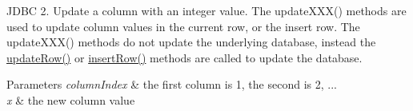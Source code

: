 J\+D\+BC 2. Update a column with an integer value. The update\+X\+X\+X() methods are used to update column values in the current row, or the insert row. The update\+X\+X\+X() methods do not update the underlying database, instead the \mbox{\hyperlink{classcom_1_1mysql_1_1jdbc_1_1_updatable_result_set_a919969ba4b3c7cbc7b18605e9f31a746}{update\+Row()}} or \mbox{\hyperlink{classcom_1_1mysql_1_1jdbc_1_1_updatable_result_set_aef041f8d9d0778083716fc26652648fa}{insert\+Row()}} methods are called to update the database.


\begin{DoxyParams}{Parameters}
{\em column\+Index} & the first column is 1, the second is 2, ... \\
\hline
{\em x} & the new column value\\
\hline
\end{DoxyParams}

